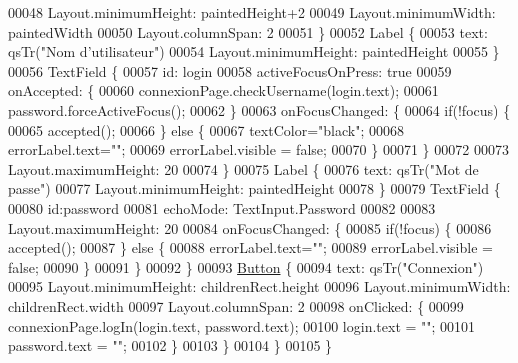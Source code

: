 \begin{DoxyCode}
00048             Layout.minimumHeight: paintedHeight+2
00049             Layout.minimumWidth: paintedWidth
00050             Layout.columnSpan: 2
00051         \}
00052         Label \{
00053             text: qsTr(\textcolor{stringliteral}{"Nom d'utilisateur"})
00054             Layout.minimumHeight: paintedHeight
00055         \}
00056         TextField \{
00057             \textcolor{keywordtype}{id}: login
00058             activeFocusOnPress: \textcolor{keyword}{true}
00059             onAccepted: \{
00060                 connexionPage.checkUsername(login.text);
00061                 password.forceActiveFocus();
00062             \}
00063             onFocusChanged: \{
00064                 \textcolor{keywordflow}{if}(!focus) \{
00065                     accepted();
00066                 \} \textcolor{keywordflow}{else} \{
00067                     textColor=\textcolor{stringliteral}{"black"};
00068                     errorLabel.text=\textcolor{stringliteral}{""};
00069                     errorLabel.visible = \textcolor{keyword}{false};
00070                 \}
00071             \}
00072 
00073             Layout.maximumHeight: 20
00074         \}
00075         Label \{
00076             text: qsTr(\textcolor{stringliteral}{"Mot de passe"})
00077             Layout.minimumHeight: paintedHeight
00078         \}
00079         TextField \{
00080             \textcolor{keywordtype}{id}:password
00081             echoMode: TextInput.Password
00082 
00083             Layout.maximumHeight: 20
00084             onFocusChanged: \{
00085                 \textcolor{keywordflow}{if}(!focus) \{
00086                     accepted();
00087                 \} \textcolor{keywordflow}{else} \{
00088                     errorLabel.text=\textcolor{stringliteral}{""};
00089                     errorLabel.visible = \textcolor{keyword}{false};
00090                 \}
00091             \}
00092         \}
00093         \hyperlink{classButton}{Button} \{
00094             text: qsTr(\textcolor{stringliteral}{"Connexion"})
00095             Layout.minimumHeight: childrenRect.height
00096             Layout.minimumWidth: childrenRect.width
00097             Layout.columnSpan: 2
00098             onClicked: \{
00099                 connexionPage.logIn(login.text, password.text);
00100                 login.text = \textcolor{stringliteral}{""};
00101                 password.text = \textcolor{stringliteral}{""};
00102             \}
00103         \}
00104     \}
00105 \}
\end{DoxyCode}
